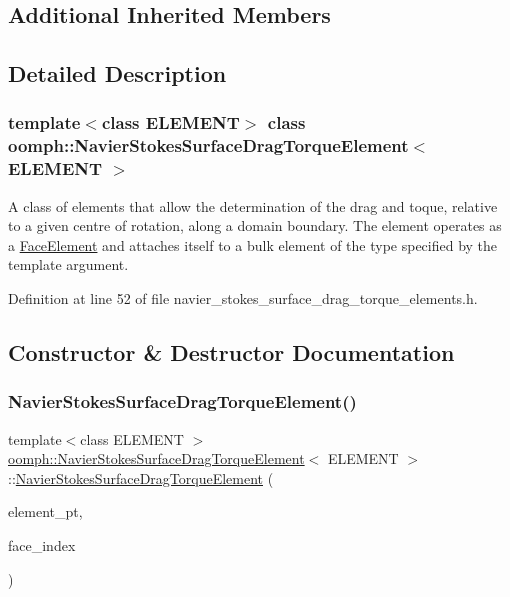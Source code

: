 \subsection*{Additional Inherited Members}


\subsection{Detailed Description}
\subsubsection*{template$<$class E\+L\+E\+M\+E\+NT$>$\newline
class oomph\+::\+Navier\+Stokes\+Surface\+Drag\+Torque\+Element$<$ E\+L\+E\+M\+E\+N\+T $>$}

A class of elements that allow the determination of the drag and toque, relative to a given centre of rotation, along a domain boundary. The element operates as a \hyperlink{classoomph_1_1FaceElement}{Face\+Element} and attaches itself to a bulk element of the type specified by the template argument. 

Definition at line 52 of file navier\+\_\+stokes\+\_\+surface\+\_\+drag\+\_\+torque\+\_\+elements.\+h.



\subsection{Constructor \& Destructor Documentation}
\mbox{\label{classoomph_1_1NavierStokesSurfaceDragTorqueElement_a78e757739ad818c8a96309fcb515f44a}} 
\subsubsection{\texorpdfstring{Navier\+Stokes\+Surface\+Drag\+Torque\+Element()}{NavierStokesSurfaceDragTorqueElement()}}
{\footnotesize\ttfamily template$<$class E\+L\+E\+M\+E\+NT $>$ \\
\hyperlink{classoomph_1_1NavierStokesSurfaceDragTorqueElement}{oomph\+::\+Navier\+Stokes\+Surface\+Drag\+Torque\+Element}$<$ E\+L\+E\+M\+E\+NT $>$\+::\hyperlink{classoomph_1_1NavierStokesSurfaceDragTorqueElement}{Navier\+Stokes\+Surface\+Drag\+Torque\+Element} (\begin{DoxyParamCaption}\item[{\hyperlink{classoomph_1_1FiniteElement}{Finite\+Element} $\ast$const \&}]{element\+\_\+pt,  }\item[{const int \&}]{face\+\_\+index }\end{DoxyParamCaption})\hspace{0.3cm}{\ttfamily [inline]}}



